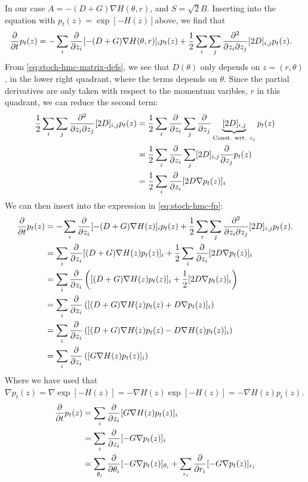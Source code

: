 In our case $A = -(D+G)\nabla H(\theta, r)$, and $S = \sqrt{2}B$. Inserting into the equation with $p_t(z) = \exp[-H(z)]$above, we find that
\begin{align} \label{eq:stoch-hmc-fp}
    \pdv{t} p_t(z) &= - \sum_{i} \pdv{z_i} [ -(D+G)\nabla H(\theta, r)]_i p_t(z) 
        + \frac{1}{2}\sum_{i}\sum_{j}\pdv{}{z_i}{z_j}[2D]_{i,j}p_t(z). 
\end{align}
From \cref{eq:stoch-hmc-matrix-defs}, we see that $D(\theta)$ only depends on $z = (r, \theta)$, in the lower right quadrant, where the terms depends on $\theta$. Since the partial derivatives are only taken with respect to the momentum varibles, $r$ in this quadrant, we can reduce the second term:
\begin{align*}
    \frac{1}{2}\sum_{i}\sum_{j}\pdv{}{z_i}{z_j}[2D]_{i,j}p_t(z)
    &= \frac{1}{2}\sum_{i}\pdv{z_i}\sum_{j}\pdv{z_j}\underbrace{[2D]_{i,j}}_{\text{Const. wrt. $z_j$}}p_t(z) \\
    &= \frac{1}{2}\sum_{i}\pdv{z_i}\sum_{j}[2D]_{i,j}\pdv{z_j}p_t(z)\\
    &= \frac{1}{2}\sum_{i}\pdv{z_i}[2D \nabla p_t(z)]_{i}
\end{align*}
We can then insert into the expression in \cref{eq:stoch-hmc-fp}:
\begin{align*} 
    \pdv{t} p_t(z) &= - \sum_{i} \pdv{z_i} [ -(D+G)\nabla H(z)]_i p_t(z) 
        + \frac{1}{2}\sum_{i}\sum_{j}\pdv{}{z_i}{z_j}[2D]_{i,j}p_t(z). \\
    &=  \sum_{i} \pdv{z_i} [ (D+G)\nabla H(z)p_t(z)]_i 
        + \frac{1}{2}\sum_{i}\pdv{z_i}[2D \nabla p_t(z)]_{i} \\
    &=  \sum_{i} \pdv{z_i} \left([ (D+G)\nabla H(z)p_t(z)]_i 
        + \frac{1}{2}[2D \nabla p_t(z)]_{i}\right) \\
    &=  \sum_{i} \pdv{z_i} \left([ (D+G)\nabla H(z)p_t(z) 
        + D \nabla p_t(z)]_{i}\right) \\
    &=  \sum_{i} \pdv{z_i} \left([ (D+G)\nabla H(z)p_t(z) 
        - D \nabla H(z) p_t(z)]_{i}\right) \\
    &=  \sum_{i} \pdv{z_i} \left([ G\nabla H(z)p_t(z)]_i \right) 
\end{align*}
Where we have used that $\nabla p_t(z) = \nabla \exp[-H(z)]= -\nabla H(z) \exp[-H(z)] =  -\nabla H(z) p_t(z)$. 
\begin{align}
    \pdv{t} p_t(z) &= \sum_{i} \pdv{z_i} [ G\nabla H(z)p_t(z)]_i \\
                &= \sum_{i} \pdv{z_i} [ -G\nabla p_t(z)]_i \\
                &= \sum_{\theta_i} \pdv{\theta_i} [ -G\nabla p_t(z)]_{\theta_i}
                + \sum_{r_i} \pdv{r_i} [ -G\nabla p_t(z)]_{r_i} \\
\end{align}
